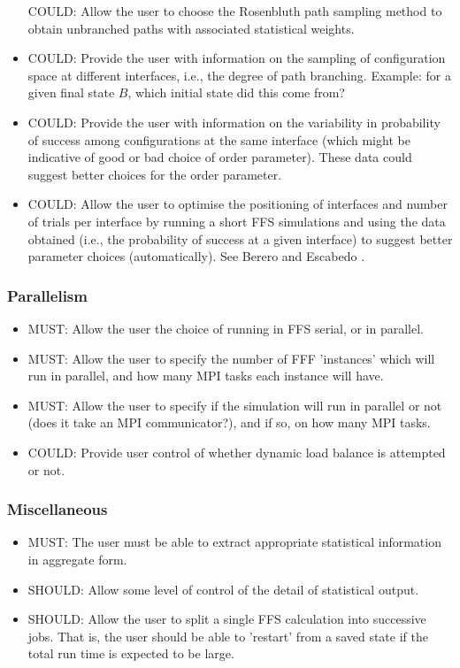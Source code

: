 \documentclass[11pt]{article}
\begin{document}
\begin{itemize}
COULD: Allow the user to choose the Rosenbluth path sampling method to
obtain unbranched paths with associated statistical weights.
\item
COULD: Provide the user with information on the sampling of configuration
space at different interfaces, i.e., the degree of path branching.
Example: for a given final state $B$, which initial state did this come from?
\item
COULD: Provide the user with information on the variability in
probability of success among configurations at the same interface
(which might be indicative of good or bad choice of order parameter).
These data could suggest better choices for the order parameter.
\item
COULD: Allow the user to optimise the positioning of interfaces
and number of trials per interface by running a short FFS simulations
and using the data obtained (i.e., the probability of success at a
given interface) to suggest better parameter choices (automatically).
See Berero and Escabedo \cite{}.
\end{itemize}

\subsubsection{Parallelism}
\begin{itemize}
\item
MUST: Allow the user the choice of running in FFS serial, or in parallel.
\item
MUST: Allow the user to specify the number of FFF 'instances' which will
run in parallel, and how many MPI tasks each instance will have.
\item
MUST: Allow the user to specify if the simulation will run in parallel
or not (does it take an MPI communicator?), and if so, on how many
MPI tasks.
\item
COULD: Provide user control of whether dynamic load balance is attempted
or not.
\end{itemize}

\subsubsection{Miscellaneous}

\begin{itemize}
\item
MUST: The user must be able to extract appropriate statistical information
in aggregate form.
\item
SHOULD: Allow some level of control of the detail of statistical output.
\item
SHOULD: Allow the user to split a single FFS calculation into successive
jobs. That is, the user should be able to 'restart' from a saved state
if the total run time is expected to be large.
\end{itemize}
\end{document}
